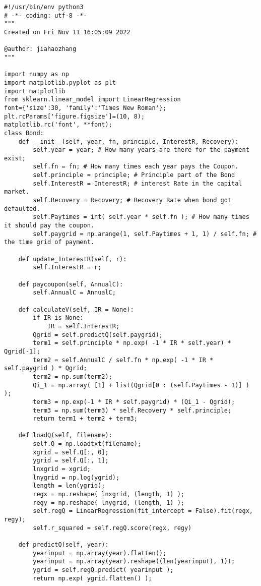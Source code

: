 \documentclass[a4paper,11pt]{article} %
\begin{document}
\begin{lstlisting}
#!/usr/bin/env python3
# -*- coding: utf-8 -*-
"""
Created on Fri Nov 11 16:05:09 2022

@author: jiahaozhang
"""

import numpy as np
import matplotlib.pyplot as plt
import matplotlib
from sklearn.linear_model import LinearRegression
font={'size':30, 'family':'Times New Roman'};
plt.rcParams['figure.figsize']=(10, 8);
matplotlib.rc('font', **font);
class Bond:
    def __init__(self, year, fn, principle, InterestR, Recovery):
        self.year = year; # How many years are there for the payment exist;
        self.fn = fn; # How many times each year pays the Coupon.
        self.principle = principle; # Principle part of the Bond
        self.InterestR = InterestR; # interest Rate in the capital market.
        self.Recovery = Recovery; # Recovery Rate when bond got defaulted.
        self.Paytimes = int( self.year * self.fn ); # How many times it should pay the coupon.
        self.paygrid = np.arange(1, self.Paytimes + 1, 1) / self.fn; # the time grid of payment.

    def update_InterestR(self, r):
        self.InterestR = r;

    def paycoupon(self, AnnualC):
        self.AnnualC = AnnualC;

    def calculateV(self, IR = None):
        if IR is None:
            IR = self.InterestR;
        Qgrid = self.predictQ(self.paygrid);
        term1 = self.principle * np.exp( -1 * IR * self.year) * Qgrid[-1];
        term2 = self.AnnualC / self.fn * np.exp( -1 * IR * self.paygrid ) * Qgrid;
        term2 = np.sum(term2);
        Qi_1 = np.array( [1] + list(Qgrid[0 : (self.Paytimes - 1)] ) );
        term3 = np.exp(-1 * IR * self.paygrid) * (Qi_1 - Qgrid);
        term3 = np.sum(term3) * self.Recovery * self.principle;
        return term1 + term2 + term3;

    def loadQ(self, filename):
        self.Q = np.loadtxt(filename);
        xgrid = self.Q[:, 0];
        ygrid = self.Q[:, 1];
        lnxgrid = xgrid;
        lnygrid = np.log(ygrid);
        length = len(ygrid);
        regx = np.reshape( lnxgrid, (length, 1) );
        regy = np.reshape( lnygrid, (length, 1) );
        self.regQ = LinearRegression(fit_intercept = False).fit(regx, regy);
        self.r_squared = self.regQ.score(regx, regy)

    def predictQ(self, year):
        yearinput = np.array(year).flatten();
        yearinput = np.array(year).reshape((len(yearinput), 1));
        ygrid = self.regQ.predict( yearinput );
        return np.exp( ygrid.flatten() );


\end{lstlisting}
\end{document}
